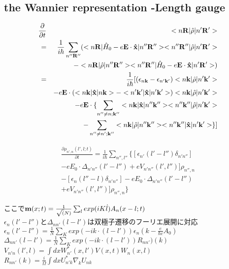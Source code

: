\documentclass[aps,prb,preprint]{revtex4-1}
\begin{document}
\begin{appendix}
\section{the Wannier representation -Length gauge }
\label{sec:WL}
\begin{eqnarray*}
\frac{ \partial }{\partial t } &&<n{\bf R}| \hat{\rho} |n'{\bf R'}> \\
= && \frac{1}{i \hbar}  \sum_{n''{\bf R''}} ( <n{\bf R}| \hat{H}_0 -e{\bf E} \cdot {\bf \hat{x}} |n''{\bf R''}><n''{\bf R''}| \hat{\rho} |n'{\bf R'}> \\
&&- <n{\bf R}| \hat{\rho} |n''{\bf R''}><n''{\bf R''}| \hat{H}_0 -e{\bf E} \cdot {\bf \hat{x}}  |n'{\bf R'}> )\\
= &&\frac{1}{i \hbar} [ (\epsilon_{n{\bf k}}-\epsilon_{n'{\bf k'}}) <n{\bf k}| \hat{\rho} |n'{\bf k'}> \\
&& -e{\bf E} \cdot(<n{\bf k}| {\bf \hat{x}} |n{\bf k}> - <n'{\bf k'}| {\bf \hat{x}} |n'{\bf k'}> ) <n{\bf k}| \hat{\rho} |n'{\bf k'}>\\ 
&&-e{\bf E} \cdot \{ \sum_{n'' \neq n; {\bf k''}} <n{\bf k}| {\bf \hat{x}} |n''{\bf k''}> <n''{\bf k''}| \hat{\rho} |n'{\bf k'}> \\
&&- \sum_{n'' \neq n'; {\bf k''}} <n{\bf k}| \hat{\rho} |n''{\bf k''}> <n''{\bf k''}| {\bf \hat{x}} |n'{\bf k'}> \} ]
\end{eqnarray*}

\begin{eqnarray*}
\frac{ \partial \rho_{n',n}(l', l; t) }{\partial t } = \frac{1}{i \hbar} \sum_{n'',l''} \{ [ \epsilon_{n'}(l'-l'') \delta_{n'n''} ] \\
- eE_0 \cdot \Delta_{n'n''}(l'-l'') + eV_{n'n''}(l', l'')] \rho_{n'',n}\\
- [ \epsilon_{n}(l''-l) \delta_{n'n''} ] - eE_0 \cdot \Delta_{n'n''}(l'-l'') \\
+ eV_{n'n''}(l', l'')] \rho_{n'',n} \}
\end{eqnarray*}

ここで${\bf m}(x;t) = \frac{1}{\sqrt (N)} \sum_{l} exp(iK \dot l) A_n(x-l; t)$\\
$\epsilon_{n}(l'-l'')$と$\Delta_{nn'}(l-l')$は双極子遷移のフーリエ展開に対応\\
$\epsilon_{n}(l'-l'') =\frac{1}{N} \sum_K exp(-ik \cdot (l-l') ) \epsilon_n(k-\frac{e}{\hbar c}A_0)$\\
$\Delta_{nn'}(l-l')=\frac{1}{N}\sum_K exp(-ik \cdot (l-l') ) R_{nn'})(k) $\\
$V_{n'n}(l',l)= \int dx W^*_{n'}(x,l') V(x,t) W_n (x,l) $\\
$R_{nn'}(k) = \frac{i}{\Omega} \int dx U^*_{n'k} \nabla_k U_{nk}$\\


\end{appendix}
\end{document}
